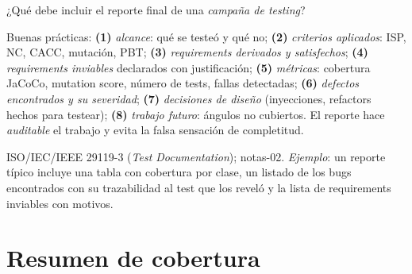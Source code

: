 \documentclass[11pt,a4paper]{article}
\newcounter{preg}
\newcommand{\qa}[3]{%
  \stepcounter{preg}%
  \vspace{0.4em}
  \begin{preguntabox}{\thepreg}
  #1
  \end{preguntabox}
  \begin{respuestabox}
  #2
  \end{respuestabox}
  \begin{refbox}
  #3
  \end{refbox}
  \vspace{0.6em}
}
\begin{document}
\qa{¿Qué debe incluir el reporte final de una \emph{campaña de testing}?}
{Buenas prácticas: \textbf{(1)} \emph{alcance}: qué se testeó y qué no; \textbf{(2)} \emph{criterios aplicados}: ISP, NC, CACC, mutación, PBT; \textbf{(3)} \emph{requirements derivados y satisfechos}; \textbf{(4)} \emph{requirements inviables} declarados con justificación; \textbf{(5)} \emph{métricas}: cobertura JaCoCo, mutation score, número de tests, fallas detectadas; \textbf{(6)} \emph{defectos encontrados y su severidad}; \textbf{(7)} \emph{decisiones de diseño} (inyecciones, refactors hechos para testear); \textbf{(8)} \emph{trabajo futuro}: ángulos no cubiertos. El reporte hace \emph{auditable} el trabajo y evita la falsa sensación de completitud.}
{ISO/IEC/IEEE 29119-3 (\emph{Test Documentation}); notas-02. \emph{Ejemplo}: un reporte típico incluye una tabla con cobertura por clase, un listado de los bugs encontrados con su trazabilidad al test que los reveló y la lista de requirements inviables con motivos.}

\section{Resumen de cobertura}
\end{document}

